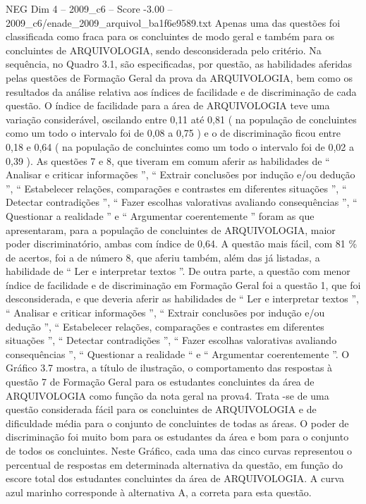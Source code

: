\begin{textsample}{NEG Dim 4 – 2009\_c6 – Score -3.00 – 2009\_c6/enade\_2009\_arquivol\_ba1f6e9589.txt}
Apenas uma das questões foi classificada como fraca para os concluintes de modo geral e também para os concluintes de ARQUIVOLOGIA, sendo desconsiderada pelo critério.
Na sequência, no Quadro 3.1, são especificadas, por questão, as habilidades aferidas pelas questões de Formação Geral da prova da ARQUIVOLOGIA, bem como os resultados da análise relativa aos índices de facilidade e de discriminação de cada questão.
O índice de facilidade para a área de ARQUIVOLOGIA teve uma variação considerável, oscilando entre 0,11 até 0,81 ( na população de concluintes como um todo o intervalo foi de 0,08 a 0,75 ) e o de discriminação ficou entre 0,18 e 0,64 ( na população de concluintes como um todo o intervalo foi de 0,02 a 0,39 ).
As questões 7 e 8, que tiveram em comum aferir as habilidades de “ Analisar e criticar informações ”, “ Extrair conclusões por indução e/ou dedução ”, “ Estabelecer relações, comparações e contrastes em diferentes situações ”, “ Detectar contradições ”, “ Fazer escolhas valorativas avaliando consequências ”, “ Questionar a realidade ” e “ Argumentar coerentemente ” foram as que apresentaram, para a população de concluintes de ARQUIVOLOGIA, maior poder discriminatório, ambas com índice de 0,64.
A questão mais fácil, com 81 \% de acertos, foi a de número 8, que aferiu também, além das já listadas, a habilidade de “ Ler e interpretar textos ”.
De outra parte, a questão com menor índice de facilidade e de discriminação em Formação Geral foi a questão 1, que foi desconsiderada, e que deveria aferir as habilidades de “ Ler e interpretar textos ”, “ Analisar e criticar informações ”, “ Extrair conclusões por indução e/ou dedução ”, “ Estabelecer relações, comparações e contrastes em diferentes situações ”, “ Detectar contradições ”, “ Fazer escolhas valorativas avaliando consequências ”, “ Questionar a realidade “ e “ Argumentar coerentemente ”.
O Gráfico 3.7 mostra, a título de ilustração, o comportamento das respostas à questão 7 de Formação Geral para os estudantes concluintes da área de ARQUIVOLOGIA como função da nota geral na prova4.
Trata -se de uma questão considerada fácil para os concluintes de ARQUIVOLOGIA e de dificuldade média para o conjunto de concluintes de todas as áreas.
O poder de discriminação foi muito bom para os estudantes da área e bom para o conjunto de todos os concluintes.
Neste Gráfico, cada uma das cinco curvas representou o percentual de respostas em determinada alternativa da questão, em função do escore total dos estudantes concluintes da área de ARQUIVOLOGIA.
A curva azul marinho corresponde à alternativa A, a correta para esta questão.

\end{textsample}

